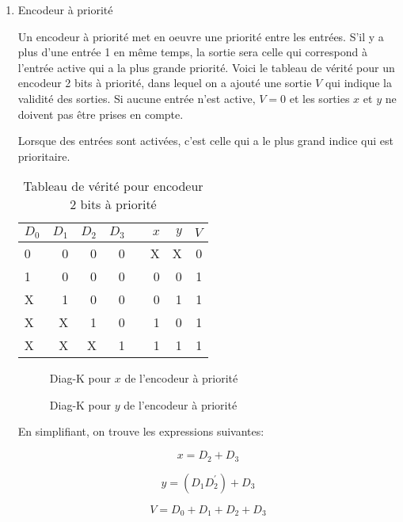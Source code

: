 \documentclass[letter, oneside]{book}
\begin{document}
\begin{enumerate}
\item Encodeur à priorité
\label{sec:orgf1853c4}

Un encodeur à priorité met en oeuvre une priorité entre les
entrées. S'il y a plus d'une entrée 1 en même temps, la sortie sera
celle qui correspond à l'entrée active qui a la plus grande
priorité. Voici le tableau de vérité pour un encodeur 2 bits à priorité,
dans lequel on a ajouté une sortie \(V\) qui indique la validité des
sorties. Si aucune entrée n'est active, \(V=0\) et les sorties \(x\)
et \(y\) ne doivent pas être prises en compte.

Lorsque des entrées sont activées, c'est celle qui a le plus grand
indice qui est prioritaire.

\begin{table}[htbp]
\caption{\label{tab:org7b94279}Tableau de vérité pour encodeur 2 bits à priorité}
\centering
\begin{tabular}{lrrrlrrr}
\(D_0\) & \(D_1\) & \(D_2\) & \(D_3\) &  & \(x\) & \(y\) & \(V\)\\[0pt]
\hline
0 & 0 & 0 & 0 &  & X & X & 0\\[0pt]
1 & 0 & 0 & 0 &  & 0 & 0 & 1\\[0pt]
X & 1 & 0 & 0 &  & 0 & 1 & 1\\[0pt]
X & X & 1 & 0 &  & 1 & 0 & 1\\[0pt]
X & X & X & 1 &  & 1 & 1 & 1\\[0pt]
\end{tabular}
\end{table}

\begin{figure}[htbp]
\centering

\caption{\label{fig:orga28034c}Diag-K pour \(x\) de l'encodeur à priorité}
\end{figure}

\begin{figure}[htbp]
\centering

\caption{\label{fig:orge5d952b}Diag-K pour \(y\) de l'encodeur à priorité}
\end{figure}

En simplifiant, on trouve les expressions suivantes:

$$x = D_2 + D_3$$

$$y = (D_1 D_2^\prime) + D_3$$

$$V = D_0 + D_1 + D_2 + D_3$$


\end{enumerate}
\end{document}
